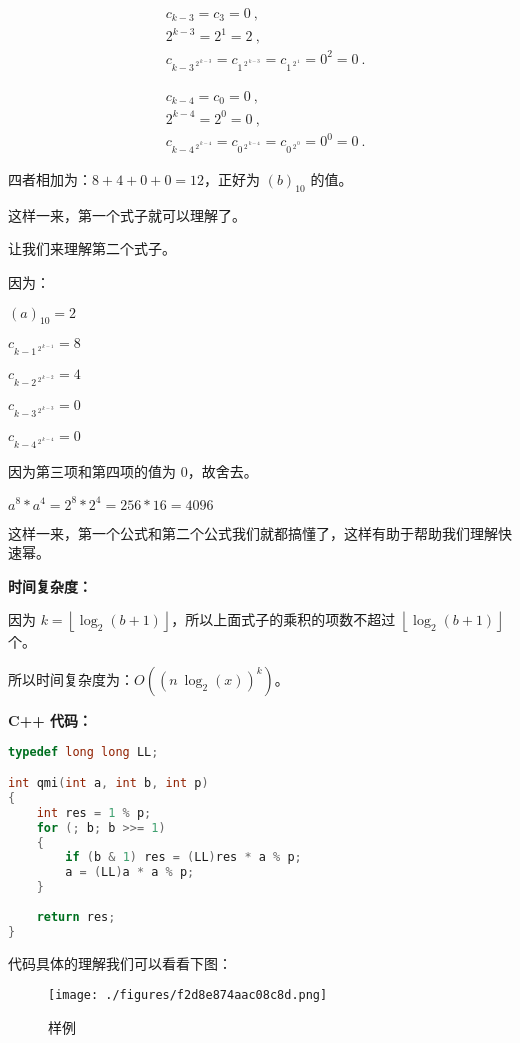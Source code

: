 $$
\begin{aligned}
&c_{k - 3} = c_3 = 0~,\\
&2 ^ {k - 3} = 2 ^ 1 = 2~,\\
&c_{{k-3}^{\ 2^{\ k-3}}} = c_{{1}^{\ 2^{\ k-3}}} = c_{{1}^{\ 2^{\ 1}}} = 0^2 = 0~.
\end{aligned}
$$

$$
\begin{aligned}
&c_{k - 4} = c_0 = 0~,\\
&2 ^ {k - 4} = 2 ^ 0 = 0~,\\
&c_{{k-4}^{\ 2^{\ k-4}}} = c_{{0}^{\ 2^{\ k-4}}} = c_{{0}^{\ 2^{\ 0}}} = 0^0 = 0~.
\end{aligned}
$$


四者相加为：$8 + 4 + 0 + 0 = 12$，正好为 $(b) _ {10}$ 的值。

这样一来，第一个式子就可以理解了。

让我们来理解第二个式子。

因为：

$(a)_{10} = 2$

$c_{{k-1}^{\ 2^{\ k-1}}} = 8$

$c_{{k-2}^{\ 2^{\ k-2}}} = 4$

$c_{{k-3}^{\ 2^{\ k-3}}} = 0$

$c_{{k-4}^{\ 2^{\ k-4}}} = 0$

因为第三项和第四项的值为 $0$，故舍去。 

$a ^ 8 * a ^ 4 = 2 ^ 8 * 2 ^ 4 = 256 * 16 = 4096$

这样一来，第一个公式和第二个公式我们就都搞懂了，这样有助于帮助我们理解快速幂。

\textbf{时间复杂度：}

因为 $k=\left\lfloor{\log_2(b+1)}\right\rfloor$，所以上面式子的乘积的项数不超过 $\left\lfloor{\log_2(b+1)}\right\rfloor$ 个。

所以时间复杂度为：$O((n\ \log_2(x))^k)$。

\textbf{C++ 代码：}

\begin{lstlisting}[language=cpp]
typedef long long LL;

int qmi(int a, int b, int p)
{
    int res = 1 % p;
    for (; b; b >>= 1)
    {
        if (b & 1) res = (LL)res * a % p;
        a = (LL)a * a % p;
    }
    
    return res;
}
\end{lstlisting}

代码具体的理解我们可以看看下图：
\begin{figure}[ht]
\centering
\texttt{[image: ./figures/f2d8e874aac08c8d.png]}
\caption{样例} \label{fig_qmi_2}
\end{figure}
